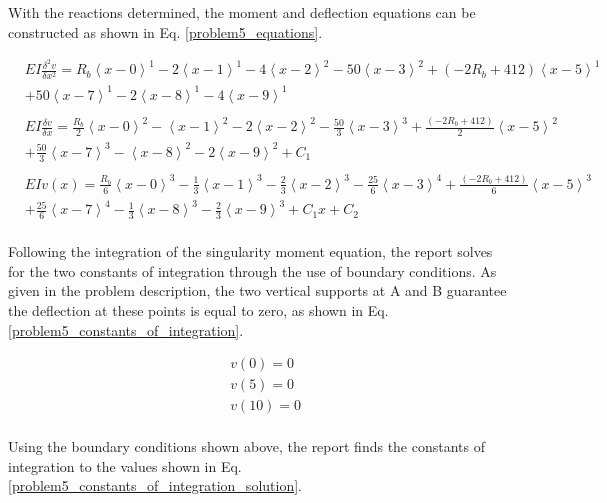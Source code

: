 \documentclass[a4paper]{article}
\begin{document}
With the reactions determined, the moment and deflection equations can be constructed as shown in Eq. \ref{problem5_equations}.

\begin{equation}
    \begin{split}
& EI \frac{\delta^2 v}{\delta x^2} = R_b\left<x-0\right>^1 - 2\left<x-1\right>^1 -  4\left<x-2\right>^2 - 50\left<x-3\right>^2 + (-2R_b+412)\left<x-5\right>^1 \\
& + 50\left<x-7\right>^1 - 2\left<x-8\right>^1 -  4\left<x-9\right>^1 \\
& \\
& EI \frac{\delta v}{\delta x} = \frac{R_b}{2}\left<x-0\right>^2 - \left<x-1\right>^2 -  2\left<x-2\right>^2 - \frac{50}{3}\left<x-3\right>^3 + \frac{(-2R_b+412)}{2}\left<x-5\right>^2 \\
& + \frac{50}{3}\left<x-7\right>^3 - \left<x-8\right>^2 -  2\left<x-9\right>^2  + C_1\\
& \\
& EI v(x) = \frac{R_b}{6}\left<x-0\right>^3 - \frac{1}{3}\left<x-1\right>^3 -  \frac{2}{3}\left<x-2\right>^3 - \frac{25}{6}\left<x-3\right>^4 + \frac{(-2R_b+412)}{6}\left<x-5\right>^3 \\
&  + \frac{25}{6}\left<x-7\right>^4 - \frac{1}{3}\left<x-8\right>^3 -  \frac{2}{3}\left<x-9\right>^3 + C_1x + C_2 \\
\end{split}
\label{problem5_equations}
\end{equation}

Following the integration of the singularity moment equation, the report solves for the two constants of integration through the use of boundary conditions. As given in the problem description, the two vertical supports at A and B guarantee the deflection at these points is equal to zero, as shown in Eq. \ref{problem5_constants_of_integration}.

\begin{equation}
\begin{split}
	& v(0) = 0 \\
	& v(5) = 0 \\
	& v(10) = 0 \\
\end{split}
\label{problem5_constants_of_integration}
\end{equation}

Using the boundary conditions shown above, the report finds the constants of integration to the values shown in Eq. \ref{problem5_constants_of_integration_solution}.
\end{document}
